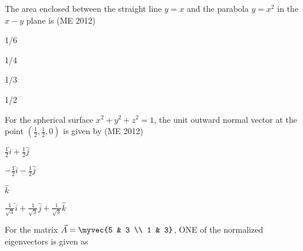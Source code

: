    \item The area enclosed between the straight line $y = x$ and the parabola \(y = x^2\) in the $x-y$ plane is
	    \hfill (ME 2012)
          \begin{enumerate}
              \begin{multicols}{4}
                  \item 1/6
                  \item 1/4
                  \item 1/3
                  \item 1/2
              \end{multicols}
          \end{enumerate}
    \item For the spherical surface \(x^2 + y^2 + z^2 = 1\), the unit outward normal vector at the point \(\left(\frac{1}{2}, \frac{1}{2}, 0\right)\) is given by
	    \hfill (ME 2012)
          \begin{enumerate}
              \begin{multicols}{4}
                  \item \(\frac{1}{2}\hat{i} + \frac{1}{2}\hat{j}\)
                  \item \(-\frac{1}{2}\hat{i} - \frac{1}{2}\hat{j}\)
                  \item \(\hat{k}\)
                  \item \(\frac{1}{\sqrt{3}}\hat{i} + \frac{1}{\sqrt{3}}\hat{j} + \frac{1}{\sqrt{3}}\hat{k}\)
              \end{multicols}
          \end{enumerate}
    \item For the matrix \(\vec{A} = \myvec{5 & 3 \\ 1 & 3}\), ONE of the normalized eigenvectors is given as

